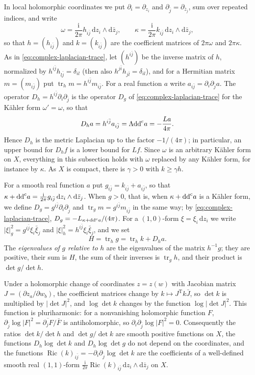 In local holomorphic coordinates we put $\partial_i=\partial_{z_i}$ and $\partial_{\bar j}=\partial_{\bar z_j}$, sum over repeated indices, and write
\[
 \omega=\frac{\mathrm i}{2\pi}h_{i\bar j}\,
                 \mathrm dz_i\wedge\mathrm d\bar z_j,
 \qquad
 \kappa=\frac{\mathrm i}{2\pi}k_{i\bar j}\,
                 \mathrm dz_i\wedge\mathrm d\bar z_j,
\]
so that $h=(h_{i\bar j})$ and $k=(k_{i\bar j})$ are the coefficient matrices of $2\pi\omega$ and $2\pi\kappa$. As in \eqref{eq:complex-laplacian-trace}, let $(h^{i\bar j})$ be the inverse matrix of $h$, normalized by $h^{i\bar j}h_{l\bar j}=\delta_{il}$ (then also $h^{j\bar i}h_{j\bar l}=\delta_{il}$), and for a Hermitian matrix $m=(m_{i\bar j})$ put $\operatorname{tr}_hm=h^{i\bar j}m_{i\bar j}$. For a real function $a$ write $a_{i\bar j}=\partial_i\partial_{\bar j}a$. The operator $D_h=h^{i\bar j}\partial_i\partial_{\bar j}$ is the operator $D_g$ of \eqref{eq:complex-laplacian-trace} for the K\"ahler form $\omega'=\omega$, so that
\[
 D_ha=h^{i\bar j}a_{i\bar j}=\Lambda\mathrm{dd}^{\mathrm{c}} a=-\frac{La}{4\pi}.
\]
Hence $D_h$ is the metric Laplacian up to the factor $-1/(4\pi)$; in particular, an upper bound for $D_hf$ is a lower bound for $Lf$. Since $\omega$ is an arbitrary K\"ahler form on $X$, everything in this subsection holds with $\omega$ replaced by any K\"ahler form, for instance by $\kappa$. As $X$ is compact, there is $\gamma>0$ with $k\geq\gamma h$.

For a smooth real function $a$ put $g_{i\bar j}=k_{i\bar j}+a_{i\bar j}$, so that $\kappa+\mathrm{dd}^{\mathrm{c}} a=\frac{\mathrm i}{2\pi}g_{i\bar j}\,\mathrm dz_i\wedge\mathrm d\bar z_j$. When $g>0$, that is, when $\kappa+\mathrm{dd}^{\mathrm{c}} a$ is a K\"ahler form, we define $D_g=g^{i\bar j}\partial_i\partial_{\bar j}$ and $\operatorname{tr}_gm=g^{i\bar j}m_{i\bar j}$ in the same way; by \eqref{eq:complex-laplacian-trace}, $D_g=-L_{\kappa+\mathrm{dd}^{\mathrm{c}} a}/(4\pi)$. For a $(1,0)$-form $\xi=\xi_i\,\mathrm dz_i$ we write $|\xi|_g^2=g^{i\bar j}\xi_i\bar\xi_j$ and $|\xi|_h^2=h^{i\bar j}\xi_i\bar\xi_j$, and we set
\[
 H=\operatorname{tr}_hg=\operatorname{tr}_hk+D_ha.
\]
The \emph{eigenvalues of $g$ relative to $h$} are the eigenvalues of the matrix $h^{-1}g$; they are positive, their sum is $H$, the sum of their inverses is $\operatorname{tr}_gh$, and their product is $\det g/\det h$.

Under a holomorphic change of coordinates $z=z(w)$ with Jacobian matrix $J=(\partial z_a/\partial w_b)$, the coefficient matrices change by $k\mapsto J^{\mathrm T}k\bar J$, so $\det k$ is multiplied by $|\det J|^2$, and $\log\det k$ changes by the function $\log|\det J|^2$. This function is pluriharmonic: for a nonvanishing holomorphic function $F$, $\partial_{\bar j}\log|F|^2=\overline{\partial_jF}/\bar F$ is antiholomorphic, so $\partial_i\partial_{\bar j}\log|F|^2=0$. Consequently the ratios $\det k/\det h$ and $\det g/\det k$ are smooth positive functions on $X$, the functions $D_h\log\det k$ and $D_h\log\det g$ do not depend on the coordinates, and the functions $\operatorname{Ric}(k)_{i\bar j}=-\partial_i\partial_{\bar j}\log\det k$ are the coefficients of a well-defined smooth real $(1,1)$-form $\frac{\mathrm i}{2\pi}\operatorname{Ric}(k)_{i\bar j}\,\mathrm dz_i\wedge\mathrm d\bar z_j$ on $X$.

